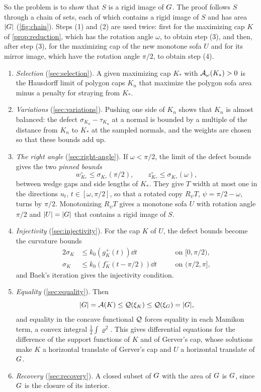 So the problem is to show that $S$ is a rigid image of $G$. The proof follows
$S$ through a chain of sets, each of which contains a rigid image of $S$ and has
area $\lvert G\rvert$ (\cref{fig:chain}). Steps (1) and (2) are used twice: first for
the maximizing cap $K$ of \cref{prop:reduction}, which has the rotation angle
$\omega$, to obtain step (3), and then, after step (3), for the maximizing cap
of the new monotone sofa $U$ and for its mirror image, which have the rotation
angle $\pi/2$, to obtain step (4).
\begin{enumerate}[label=(\arabic*)]
\item \emph{Selection} (\cref{sec:selection}). A given maximizing cap $K_*$ with
$\mathcal{A}_\omega(K_*)>0$ is the Hausdorff limit of polygon caps $K_n$ that maximize
the polygon sofa area minus a penalty for straying from $K_*$.
\item \emph{Variations} (\cref{sec:variations}). Pushing one side of $K_n$ shows
that $K_n$ is almost balanced: the defect $\sigma_{K_n}-\tau_{K_n}$ at a normal
is bounded by a multiple of the distance from $K_n$ to $K_*$ at the sampled
normals, and the weights are chosen so that these bounds add up.
\item \emph{The right angle} (\cref{sec:right-angle}). If $\omega<\pi/2$, the
limit of the defect bounds gives the two \emph{pinned bounds}
\[
  w^\circ_{K_*}\le\sigma_{K_*}(\pi/2),\qquad
  z^\circ_{K_*}\le\sigma_{K_*}(\omega),
\]
between wedge gaps and side lengths of $K_*$. They give $T$ width at most one in
the directions $u_t$, $t\in[\omega,\pi/2]$, so that a rotated copy $R_\psi T$,
$\psi=\pi/2-\omega$, turns by $\pi/2$. Monotonizing $R_\psi T$ gives a monotone
sofa $U$ with rotation angle $\pi/2$ and $\lvert U\rvert=\lvert G\rvert$ that contains a rigid
image of $S$.
\item \emph{Injectivity} (\cref{sec:injectivity}). For the cap $K$ of $U$, the
defect bounds become the curvature bounds
\begin{alignat*}{2}
  \sigma_K&\le k_0(g_K^+(t))\dd t&\quad&\text{on }[0,\pi/2),\\
  \sigma_K&\le k_0(f_K^-(t-\pi/2))\dd t&&\text{on }(\pi/2,\pi],
\end{alignat*}
and Baek's iteration gives the injectivity condition.
\item \emph{Equality} (\cref{sec:equality}). Then
\[
  \lvert G\rvert=\mathcal{A}(K)\le\mathcal{Q}(\xi_K)\le\mathcal{Q}(\xi_G)=\lvert G\rvert,
\]
and equality in the concave functional $\mathcal{Q}$ forces equality in each Mamikon
term, a convex integral $\frac12\int\varrho^2$. This gives differential
equations for the difference of the support functions of $K$ and of Gerver's
cap, whose solutions make $K$ a horizontal translate of Gerver's cap and $U$ a
horizontal translate of $G$.
\item \emph{Recovery} (\cref{sec:recovery}). A closed subset of $G$ with the
area of $G$ is $G$, since $G$ is the closure of its interior.
\end{enumerate}

